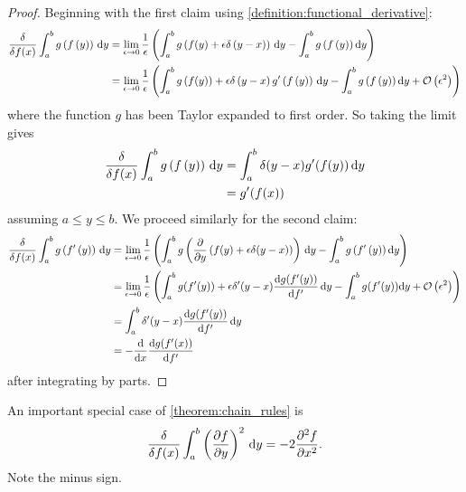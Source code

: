 \begin{proof}
  Beginning with the first claim using \cref{definition:functional_derivative}:
  \begin{align*}
    \fdv{f(x)} \int_a^b g\left(f\left(y\right)\right)\,\mathrm{d}y &= \lim_{\epsilon\rightarrow 0} \frac{1}{\epsilon} \left(\int_a^b g\left(f(y) + \epsilon \delta\left(y-x\right)\right)\,\mathrm{d}y
                                                                     - \int_a^b g\left(f\left(y\right)\right)\mathrm{d}y \right)\\
    &=  \lim_{\epsilon\rightarrow 0} \frac{1}{\epsilon} \left(\int_a^b g\left(f(y)\right) + \epsilon \delta\left(y-x\right)g'\left(f\left(y\right)\right)\,\mathrm{d}y
                                                                     - \int_a^b g\left(f\left(y\right)\right)\mathrm{d}y + \mathcal{O}\left(\epsilon^2\right)\right)
  \end{align*}
  where the function $g$ has been Taylor expanded to first order. So taking the limit gives
  \begin{align*}
    \fdv{f(x)} \int_a^b g\left(f\left(y\right)\right)\,\mathrm{d}y &= \int_a^b \delta(y - x) g'(f(y))\,\mathrm{d}y \\
                                                                   &= g'(f(x))                                                              
  \end{align*}
  assuming $a \leq y \leq b$.
  We proceed similarly for the second claim:
  \begin{align*}
    \fdv{f(x)} \int_a^b g\left(f'\left(y\right)\right)\,\mathrm{d}y &= \lim_{\epsilon\rightarrow 0} \frac{1}{\epsilon}\left(\int_a^b g\left(\pdv{y}\left(f(y) + \epsilon \delta (y-x)\right)\right)\, \mathrm{d}y- \int_a^b g \left( f' \left( y \right) \right)\mathrm{d}y\right)       \\
                                                                    &= \lim_{\epsilon\rightarrow 0} \frac{1}{\epsilon}\left(\int_a^b g(f'(y)) + \epsilon \delta' (y-x)\dv{g(f'(y))}{f'}\, \mathrm{d}y- \int_a^b g(f'(y))\mathrm{d}y+\mathcal{O}\left(\epsilon^2\right)\right) \\
                                                                    &= \int_a^b \delta' (y-x)\dv{g(f'(y))}{f'}\, \mathrm{d}y \\
    &= - \dv{x} \dv{g(f'(x))}{f'}
  \end{align*}
  after integrating by parts.
\end{proof}

An important special case of \cref{theorem:chain_rules} is
\begin{equation}
  \label{eq:derivative_of_squared_derivative}
  \fdv{f(x)}\int_a^b \left(\pdv{f}{y}\right)^2\,\mathrm{d}y = - 2 \pdv[2]{f}{x}.
\end{equation}
Note the minus sign.